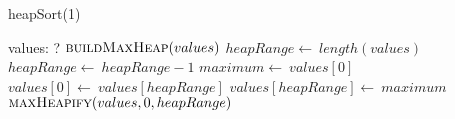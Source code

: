 \documentclass[a4paper,10pt]{article}
\begin{document}
\begin{algorithm}
\caption{heapSort(1)}
\begin{algorithmic}[5]
\State {}
\State {}
    \State values: ?
  \EndDecl
  \State \(\Call{buildMaxHeap}{values}\)
  \State \(heapRange\gets\ length(values)\)
    \State \(heapRange\gets\ heapRange-1\)
    \State \(maximum\gets\ values[0]\)
    \State \(values[0]\gets\ values[heapRange]\)
    \State \(values[heapRange]\gets\ maximum\)
    \State \(\Call{maxHeapify}{values,0,heapRange}\)
  \EndFor
\EndProcedure
\end{algorithmic}
\end{algorithm}
\end{document}
